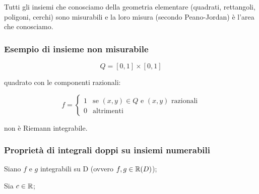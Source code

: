Tutti gli insiemi che conosciamo della geometria elementare (quadrati, rettangoli, poligoni, cerchi) sono misurabili e la loro misura (secondo Peano-Jordan) è l'area che conosciamo.

\subsubsection*{Esempio di insieme non misurabile}

\[
    Q = [0,1] \times [0,1]
\]

quadrato con le componenti razionali:

\[
    f = \begin{cases}
        1 & \text{se \((x,y) \in Q\) e \((x,y)\) razionali} \\
        0 & \text{altrimenti}
    \end{cases}
\]

non è Riemann integrabile.

\subsubsection{Proprietà di integrali doppi su insiemi numerabili}

Siano \(f\) e \(g\) integrabili su D (ovvero \(f,g \in \mathbb{R}(D)\));

Sia \(c \in \mathbb{R} \);

